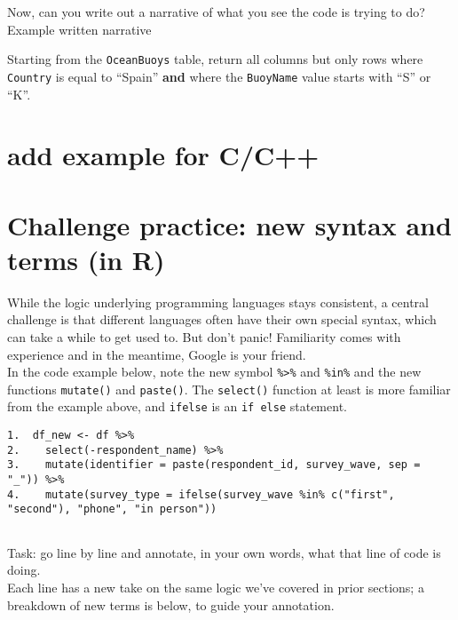 \documentclass[
]{book}
\begin{document}
\hfill\break

Now, can you write out a narrative of what you see the code is trying to do?\\

Example written narrative

Starting from the \texttt{OceanBuoys} table, return all columns but only rows where \texttt{Country} is equal to ``Spain'' \textbf{and} where the \texttt{BuoyName} value starts with ``S'' or ``K''.

\hfill\break

\section{add example for C/C++}\label{add-example-for-cc}

\section{Challenge practice: new syntax and terms (in R)}\label{challenge-practice-new-syntax-and-terms-in-r}

While the logic underlying programming languages stays consistent, a central challenge is that different languages often have their own special syntax, which can take a while to get used to. But don't panic! Familiarity comes with experience and in the meantime, Google is your friend.\\

In the code example below, note the new symbol \texttt{\%\textgreater{}\%} and \texttt{\%in\%} and the new functions \texttt{mutate()} and \texttt{paste()}. The \texttt{select()} function at least is more familiar from the example above, and \texttt{ifelse} is an \texttt{if\ else} statement.

\begin{verbatim}
1.  df_new <- df %>% 
2.    select(-respondent_name) %>% 
3.    mutate(identifier = paste(respondent_id, survey_wave, sep = "_")) %>% 
4.    mutate(survey_type = ifelse(survey_wave %in% c("first", "second"), "phone", "in person"))
  
\end{verbatim}

Task: go line by line and annotate, in your own words, what that line of code is doing.\\

Each line has a new take on the same logic we've covered in prior sections; a breakdown of new terms is below, to guide your annotation.
\end{document}

